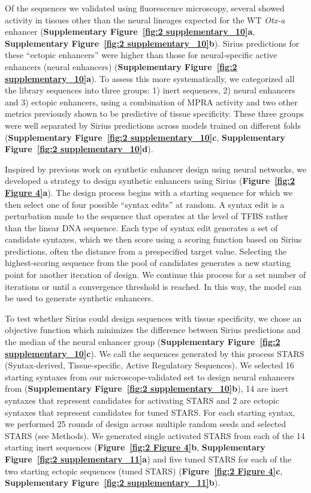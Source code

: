 Of the sequences we validated using fluorescence microscopy, several showed activity in tissues other than the neural lineages expected for the WT \textit{Otx-a} enhancer (\textbf{Supplementary Figure~\ref{fig:2 supplementary_10}a}, \textbf{Supplementary Figure~\ref{fig:2 supplementary_10}b}). Sirius predictions for these “ectopic enhancers” were higher than those for neural-specific active enhancers (neural enhancers) (\textbf{Supplementary Figure~\ref{fig:2 supplementary_10}a}). To assess this more systematically, we categorized all the library sequences into three groups: 1) inert sequences, 2) neural enhancers and 3) ectopic enhancers, using a combination of MPRA activity and two other metrics previously shown to be predictive of tissue specificity. These three groups were well separated by Sirius predictions across models trained on different folds (\textbf{Supplementary Figure~\ref{fig:2 supplementary_10}c}, \textbf{Supplementary Figure~\ref{fig:2 supplementary_10}d}).

Inspired by previous work on synthetic enhancer design using neural networks\cite{Taskiran2023-xz,Gosai2023-cw}, we developed a strategy to design synthetic enhancers using Sirius (\textbf{Figure~\ref{fig:2 Figure 4}a}). The design process begins with a starting sequence for which we then select one of four possible “syntax edits” at random. A syntax edit is a perturbation made to the sequence that operates at the level of TFBS rather than the linear DNA sequence. Each type of syntax edit generates a set of candidate syntaxes, which we then score using a scoring function based on Sirius predictions, often the distance from a prespecified target value. Selecting the highest-scoring sequence from the pool of candidates generates a new starting point for another iteration of design. We continue this process for a set number of iterations or until a convergence threshold is reached. In this way, the model can be used to generate synthetic enhancers.

To test whether Sirius could design sequences with tissue specificity, we chose an objective function which minimizes the difference between Sirius predictions and the median of the neural enhancer group (\textbf{Supplementary Figure~\ref{fig:2 supplementary_10}c}). We call the sequences generated by this process STARS (Syntax-derived, Tissue-specific, Active Regulatory Sequences). We selected 16 starting syntaxes from our microscope-validated set to design neural enhancers from (\textbf{Supplementary Figure~\ref{fig:2 supplementary_10}b}), 14 are inert syntaxes that represent candidates for activating STARS and 2 are ectopic syntaxes that represent candidates for tuned STARS. For each starting syntax, we performed 25 rounds of design across multiple random seeds and selected STARS (see Methods). We generated single activated STARS from each of the 14 starting inert sequences (\textbf{Figure~\ref{fig:2 Figure 4}b}, \textbf{Supplementary Figure~\ref{fig:2 supplementary_11}a}) and five tuned STARS for each of the two starting ectopic sequences (tuned STARS) (\textbf{Figure~\ref{fig:2 Figure 4}c}, \textbf{Supplementary Figure~\ref{fig:2 supplementary_11}b}).

